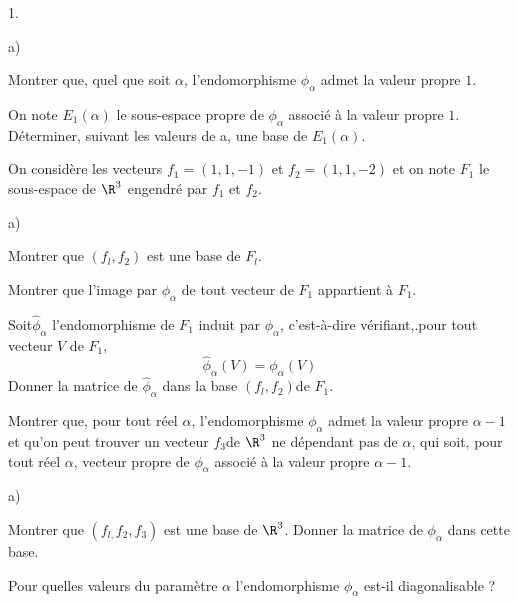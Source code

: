 \documentclass[11pt]{article}%
\begin{document}
\begin{noliste}{1.}
 \setlength{\itemsep}{4mm}
\item 

\begin{noliste}{a)}
 \setlength{\itemsep}{2mm}
\item Montrer que, quel que soit $\alpha $, l'endomorphisme
$\phi_{\alpha }$
admet la valeur propre $1$.

\item On note $E_{1}(\alpha )$ le sous-espace propre de $\phi_{\alpha
}$
associé à la valeur propre $1$. \\
Déterminer, suivant les valeurs de a, une base de $E_{1}(\alpha )$.
\end{noliste}

\item On considère les vecteurs $f_{1} = (1,1,-1)$ et $f_{2} =
(1,1,-2)$ et on
note $F_{1}$ le sous-espace de $\R^{3}$ engendré par $f_{1}$ et
$f_{2}$.

\begin{noliste}{a)}
 \setlength{\itemsep}{2mm}
\item Montrer que $(f_{l},f_{2})$ est une base de $F_{l}$.

\item Montrer que l'image par $\phi_{\alpha }$ de tout vecteur de
$F_{1}$
appartient à $F_{1}$.

\item Soit$\hat{\phi}_{\alpha }$ l'endomorphisme de $F_{1}$ induit par
$\phi
_{\alpha }$, c'est-à-dire vérifiant,.pour tout vecteur $V$ de $F_{1}$,
\[
\hat{\phi}_{\alpha }(V) = \phi_{\alpha }(V)
\]
Donner la matrice de $\hat{\phi}_{\alpha }$ dans la base
$(f_{l},f_{2})$de $F_{1}$.
\end{noliste}

\item Montrer que, pour tout réel $\alpha $, l'endomorphisme
$\phi_{\alpha
} $ admet la valeur propre $\alpha -1$ et qu'on peut trouver un vecteur
$f_{3}$de $\R^{3}$ ne dépendant pas de $\alpha $, qui soit, pour tout
réel $\alpha $, vecteur propre de $\phi_{\alpha }$ associé à la valeur
propre $\alpha -1$.

\begin{noliste}{a)}
 \setlength{\itemsep}{2mm}
\item Montrer que $(f_{l,}f_{2},f_{3})$ est une base de $\R^{3}$.
Donner la matrice de $\phi_{\alpha }$ dans cette base.

\item Pour quelles valeurs du paramètre $\alpha $ l'endomorphisme $\phi
_{\alpha }$ est-il diagonalisable ?
\end{noliste}
\end{noliste}
\end{document}
